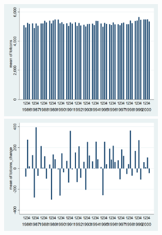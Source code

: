 \documentclass[12pt,a4paper]{article}
\begin{document}
\begin{center}
\includegraphics[width=8cm]{graphs/totcons_quarterly.png}
\includegraphics[width=8cm]{graphs/totcons_change_quarterly.png}\\
\end{center}
\end{document}
